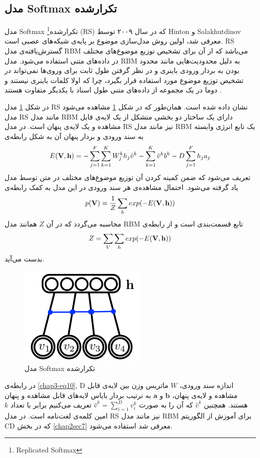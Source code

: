 	\subsection{مدل Softmax تکرارشده}
	\label{chap3sec3sub5}
	
	مدل
	Softmax
	تکرارشده\footnote{Replicated Softmax}
	(RS)
	که در سال ۲۰۰۹ توسط
	Hinton
	و
	Salakhutdinov \cite{hinton2009replicated}
	معرفی‌ شد، اولین روش مدل‌سازی موضوع بر پایه‌ی شبکه‌های عصبی است.
	RS
	گسترش‌یافته‌ی مدل
	RBM
	می‌باشد که از آن برای تشخیص توزیع موضوع‌های مختلف در داده‌های متنی استفاده می‌‌شود. مدل
	RBM
	به دلیل محدودیت‌هایی مانند محدود بودن به بردار ورودی باینری و در نظر گرفتن طول ثابت برای وروی‌ها نمی‌‌تواند در تشخیص توزیع موضوع مورد استفاده قرار بگیرد، چرا که اولا کلمات باینری نیستند و دوما در یک مجموعه از داده‌های متنی طول اسناد با یکدیگر متفاوت هستند
	\cite{hinton2009replicated}.
	
	در شکل
	\ref{chap3-fig6}
	مدل
	RS
	نشان داده شده است. همان‌طور که در شکل
	\ref{chap3-fig6}
	مشاهده می‌‌شود مدل
	RS
	مانند مدل
RBM
	دارای یک ساختار دو بخشی متشکل از یک لایه‌ی قابل مشاهده و یک لایه‌ی پنهان است. در مدل
	RS
	نیز مانند مدل
	RBM
	یک تابع انرژی وابسته به سند ورودی و بردار پنهان آن به شکل رابطه‌ی
	\begin{align}
		\centering
		\label{chap3-eq10}
		E(\textbf{V},\textbf{h}) = -\sum_{j=1}^{F} \sum_{k=1}^{K} W_j^k h_j \hat{v}^k - \sum_{k=1}^K \hat{v}^k b^k -D\sum_{j=1}^F h_ja_j
	\end{align}
	تعریف می‌‌شود که ضمن کمینه کردن آن توزیع موضوع‌های مختلف در متن توسط مدل یاد گرفته می‌‌شود. احتمال مشاهده‌ی هر سند ورودی در این مدل به کمک رابطه‌ی
	\begin{align}
		\centering
		\label{chap3-eq11}
		p(\textbf{V}) = \dfrac{1}{Z}\sum_{h}exp(-E(\textbf{V},\textbf{h}))
	\end{align}
	محاسبه می‌‌گردد که در آن
	$Z$
	همانند مدل
	RBM
	تابع قسمت‌بندی است و از رابطه‌ی
	\begin{align}
		\centering
		\label{chap3-eq12}
		Z = \sum_{V}\sum_{h}exp(-E(\textbf{V},\textbf{h}))
	\end{align}
	بدست می‌‌آید.
	\begin{figure}[!t]
		\centering
		\includegraphics[scale=0.4]{chap3-img/RS}
		\caption{مدل Softmax تکرارشده \cite{hinton2009replicated}}
		\label{chap3-fig6}
	\end{figure}	
	در رابطه‌ی
	\ref{chap3-eq10}, D
	اندازه سند ورودی،
	$W$
	ماتریس وزن بین لایه‌ی قابل مشاهده و لایه‌ی پنهان،
	$\textbf{b}$
	و
	$\textbf{a}$
	به ترتیب بردار بایاس لایه‌های قابل مشاهده و پنهان هستند. همچنین
	$\hat{v}^k$
	که آن را به صورت
	$\hat{v}^k = \sum_{i=1}^{D} v_i^k$
	 تعریف می‌‌کنیم برابر با تعداد
	$k$امین 
	کلمه‌ی لغت‌نامه است. در مدل
		RS
	نیز مانند مدل
	RBM
	برای آموزش از الگوریتم
	CD
	که در بخش
	\ref{chap2sec7}
	معرفی شد استفاده می‌‌شود.
		 
